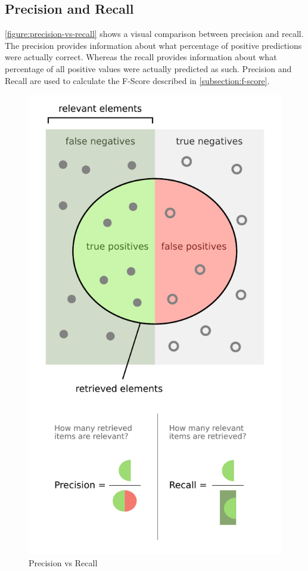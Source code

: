 \subsection{Precision and Recall}
\autoref{figure:precision-vs-recall} shows a visual comparison between precision and recall. The precision provides information about what percentage of positive predictions were actually correct. Whereas the recall provides information about what percentage of all positive values were actually predicted as such. Precision and Recall are used to calculate the F-Score described in \autoref{subsection:f-score}.
\begin{figure}[H]
    \centering
    \includegraphics[width=\textwidth/2]{./pics/Precisionrecall.pdf}
    \caption{Precision vs Recall\cite{PrecisionRecall2022}}
    \label{figure:precision-vs-recall}
\end{figure}
